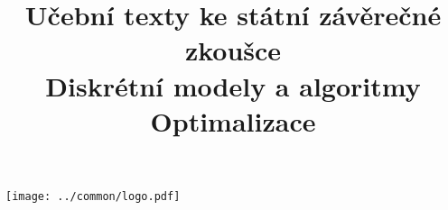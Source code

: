 \clearpage

\clearpage

\title{\LARGE Učební texty ke státní závěrečné zkoušce \\ Diskrétní modely a algoritmy \\ Optimalizace}




\maketitle

\vspace{10mm}
\begin{center}
\texttt{[image: ../common/logo.pdf]}
\end{center} 

\clearpage

\clearpage

\tableofcontents








